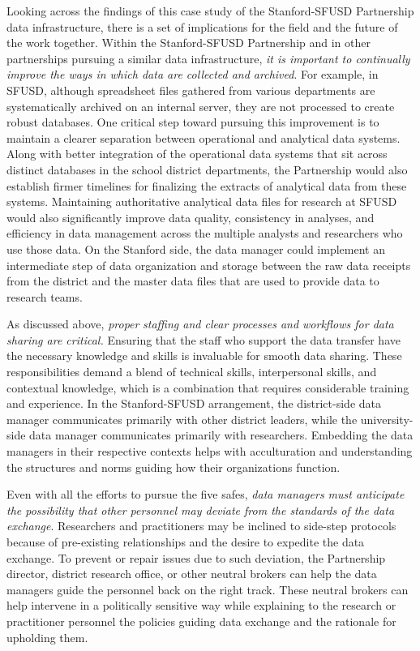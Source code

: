 Looking across the findings of this case study of the Stanford-SFUSD Partnership data infrastructure, there is a set of implications for the field and the future of the work together. Within the Stanford-SFUSD Partnership and in other partnerships pursuing a similar data infrastructure, \emph{it is important to continually improve the ways in which data are collected and archived}. For example, in SFUSD, although spreadsheet files gathered from various departments are systematically archived on an internal server, they are not processed to create robust databases. One critical step toward pursuing this improvement is to maintain a clearer separation between operational and analytical data systems. Along with better integration of the operational data systems that sit across distinct databases in the school district departments, the Partnership would also establish firmer timelines for finalizing the extracts of analytical data from these systems. Maintaining authoritative analytical data files for research at SFUSD would also significantly improve data quality, consistency in analyses, and efficiency in data management across the multiple analysts and researchers who use those data. On the Stanford side, the data manager could implement an intermediate step of data organization and storage between the raw data receipts from the district and the master data files that are used to provide data to research teams.

As discussed above, \emph{proper} \emph{staffing and clear processes and workflows for data sharing are critical.} Ensuring that the staff who support the data transfer have the necessary knowledge and skills is invaluable for smooth data sharing. These responsibilities demand a blend of technical skills, interpersonal skills, and contextual knowledge, which is a combination that requires considerable training and experience. In the Stanford-SFUSD arrangement, the district-side data manager communicates primarily with other district leaders, while the university-side data manager communicates primarily with researchers. Embedding the data managers in their respective contexts helps with acculturation and understanding the structures and norms guiding how their organizations function.

Even with all the efforts to pursue the five safes, \emph{data managers must anticipate the possibility that other personnel may deviate from the standards of the data exchange}. Researchers and practitioners may be inclined to side-step protocols because of pre-existing relationships and the desire to expedite the data exchange. To prevent or repair issues due to such deviation, the Partnership director, district research office, or other neutral brokers can help the data managers guide the personnel back on the right track. These neutral brokers can help intervene in a politically sensitive way while explaining to the research or practitioner personnel the policies guiding data exchange and the rationale for upholding them.

